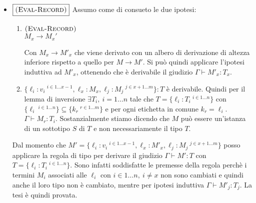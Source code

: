 \begin{itemize}
\begin{itemize}
		\item $\boxed{\textsc{(Eval-Record)}}$ 
		Assumo come di consueto le due ipotesi:
		\begin{enumerate}
			\item 
			$\textsc{(Eval-Record)}$\\
			$M_x \longrightarrow M_x'$\\
			
			Con $M_x \to M'_x$ che viene derivato con un albero di derivazione di altezza inferiore rispetto a quello per $M \to M'$.
			Si pu\`o quindi applicare l'ipotesi induttiva ad $M'_x$, ottenendo che \`e derivabile il giudizio $\Gamma \vdash M'_x : T_x$.
			\item $\{\ell_i : v_i\ ^{i \in 1 \dots x-1}, \ell_x : M_x, \ell_j : M_j\ ^{j \in x+1 \dots m}\} : T$ \`e derivabile.
			Quindi per il lemma di inversione $\exists T_i, \: i = 1 \dots n$ tale che 
			$T = \{\ell_i : T_i\ ^{i \in 1 \dots n} \}$ con $\{\ell_i\ ^{i \in 1 \dots n} \} \subseteq \{k_r\ ^{r \in 1 \dots m} \}$ 
			e per ogni etichetta in comune $k_r = \ell_i$. $\Gamma \vdash M_r : T_i$.
			Sostanzialmente stiamo dicendo che $M$ pu\`o essere un'istanza di un sottotipo $S$ di $T$ e non necessariamente il tipo $T$.
		\end{enumerate}
	
	Dal momento che $M' = \{\ell_i : v_i\ ^{i \in 1 \dots x-1}, \ell_x : M'_x, \ell_j : M_j\ ^{j \in x+1 \dots m}\}$ posso applicare la regola di tipo  per derivare il giudizio $\Gamma \vdash M' : T$ con $T = \{ \ell_i : T_i \:^{i \in 1 \ldots n} \}$.
	Sono infatti soddisfatte le premesse della regola perch\`e i termini $M_i$ associati alle $\ell_i$ con $i \in 1 \ldots n,\: i \neq x$ non sono cambiati e quindi anche il loro tipo non \`e cambiato, mentre per ipotesi induttiva $\Gamma \vdash M'_j : T_j$.
	La tesi \`e quindi provata.
	\end{itemize}
\end{itemize}


